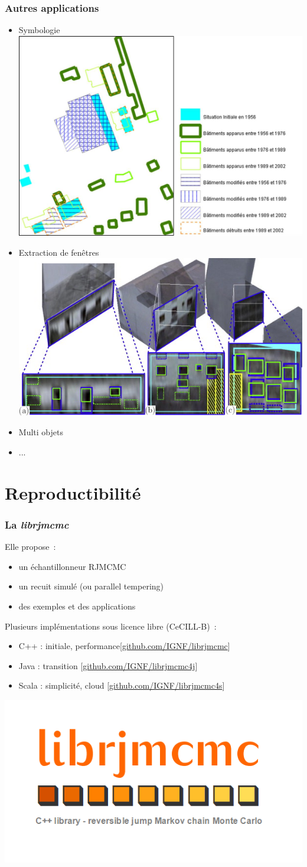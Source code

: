 \documentclass{beamer}
\begin{document}
\begin{frame}
\frametitle{Autres applications}
\begin{itemize}
\item Symbologie \hfill \includegraphics[width = 0.5\linewidth]{symbology}
\item Extraction de fenêtres \hfill \includegraphics[width = 0.5\linewidth]{jpb}
\item Multi objets
\item ...
\end{itemize}
\end{frame}


\section{Reproductibilité}
\begin{frame}
\frametitle{La \emph{librjmcmc}}

Elle propose~:
\begin{itemize}
\item un \'echantillonneur RJMCMC
\item un recuit simul\'e (ou parallel tempering)
\item des exemples et des applications
\end{itemize}

Plusieurs impl\'ementations sous licence libre (CeCILL-B)~:
\begin{itemize}
\item  C++ : initiale, performance\hfill \small[\url{github.com/IGNF/librjmcmc}]
\item  Java  : transition \hfill \small[\url{github.com/IGNF/librjmcmc4j}]
\item  Scala : simplicité, cloud \hfill \small[\url{github.com/IGNF/librjmcmc4s}]
\end{itemize}

\hfill\includegraphics[width = 0.5\linewidth]{librjmcmc}
\end{frame}
\end{document}
